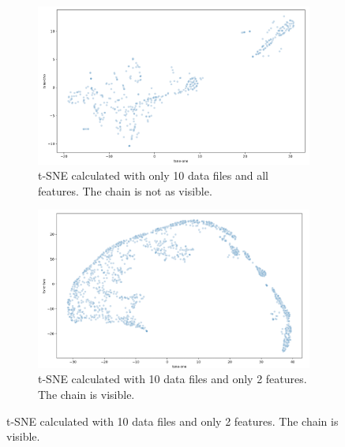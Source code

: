 



\begin{figure}[H]
  \centering
  \begin{subfigure}{.475\textwidth}
    \centering
    \includegraphics[width=1\textwidth]{./images/tsne10Files.png}
    \caption{t-SNE calculated with only 10 data files and all features. The chain is not as visible.}
    \label{figure:tsne10Files}
  \end{subfigure}%
  \hfill
  \begin{subfigure}{.475\textwidth}
    \centering
    \includegraphics[width=1\textwidth]{./images/tsne10Files2Features.png}
    \caption{t-SNE calculated with 10 data files and only 2 features. The chain is visible.}
    \label{figure:tsne10Files2Features}
  \end{subfigure}
\end{figure}

